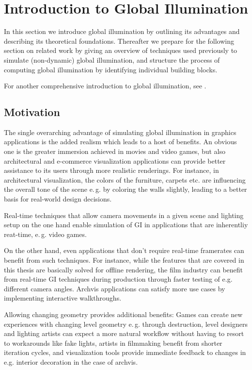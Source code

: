 \section{Introduction to Global Illumination}

In this section we introduce global illumination by outlining its advantages and describing its theoretical foundations. Thereafter we prepare for the following section on related work by giving an overview of techniques used previously to simulate (non-dynamic) global illumination, and structure the process of computing global illumination by identifying individual building blocks.

For another comprehensive introduction to global illumination, see \citet{Ritschel:2012:GISTAR}.

\subsection{Motivation}
The single overarching advantage of simulating global illumination in graphics applications is the added realism which leads to a host of benefits. An obvious one is the greater immersion achieved in movies and video games, but also architectural and e-commerce visualization applications can provide better assistance to its users through more realistic renderings. For instance, in architectural visualization, the colors of the furniture, carpets etc. are influencing the overall tone of the scene e.\,g. by coloring the walls slightly, leading to a better basis for real-world design decisions.

Real-time techniques that allow camera movements in a given scene and lighting setup on the one hand enable simulation of GI in applications that are inherentliy reat-time, e.\,g. video games.

On the other hand, even applications that don't require real-time framerates can benefit from such techniques. For instance, while the features that are covered in this thesis are basically solved for offline rendering, the film industry can benefit from real-time GI techniques during production through faster testing of e.g. different camera angles. Archvis applications can satisfy more use cases by implementing interactive walkthroughs.

Allowing changing geometry provides additional benefits: Games can create new experiences with changing level geometry e.\,g. through destruction, level designers and lighting artists can expect a more natural workflow without having to resort to workarounds like fake lights, artists in filmmaking benefit from shorter iteration cycles, and visualization tools provide immediate feedback to changes in e.g. interior decoration in the case of archvis.

